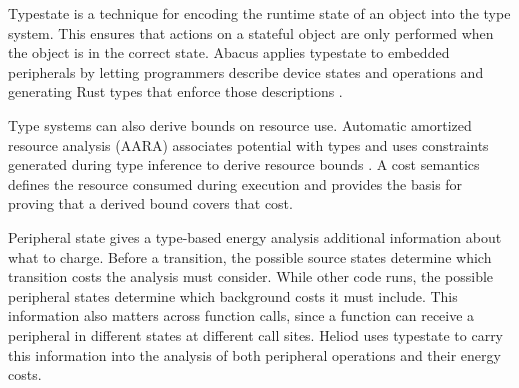 Typestate is a technique for encoding the runtime state of an object into the type system. This ensures that actions on a stateful object are only performed when the object is in the correct state. Abacus applies typestate to embedded peripherals by letting programmers describe device states and operations and generating Rust types that enforce those descriptions \cite{abacus}.

Type systems can also derive bounds on resource use. Automatic amortized resource analysis (AARA) associates potential with types and uses constraints generated during type inference to derive resource bounds \cite{Hoffmann_Jost_2022}. A cost semantics defines the resource consumed during execution and provides the basis for proving that a derived bound covers that cost.

Peripheral state gives a type-based energy analysis additional information about what to charge. Before a transition, the possible source states determine which transition costs the analysis must consider. While other code runs, the possible peripheral states determine which background costs it must include. This information also matters across function calls, since a function can receive a peripheral in different states at different call sites. Heliod uses typestate to carry this information into the analysis of both peripheral operations and their energy costs.